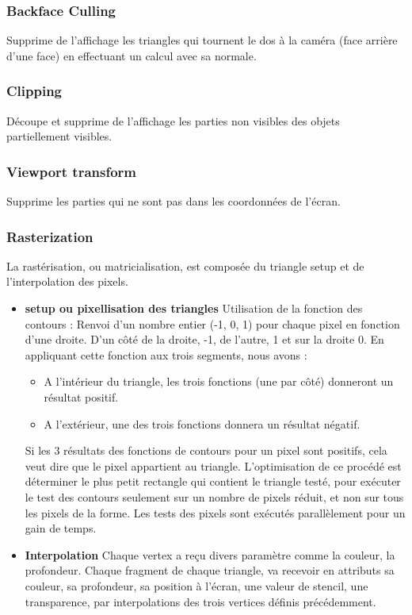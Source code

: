\subsubsection{Backface Culling}
Supprime de l’affichage les triangles qui  tournent le dos à la caméra (face arrière d’une face) en effectuant un calcul avec sa normale.
\subsubsection{Clipping}
Découpe et supprime de l’affichage les parties non visibles des objets partiellement visibles.
\subsubsection{Viewport transform}
Supprime les parties qui ne sont pas dans les coordonnées de l’écran.

\subsubsection{Rasterization}
La rastérisation, ou matricialisation, est composée du triangle setup et de l’interpolation des pixels.
\begin{itemize}
  \item{\textbf{setup ou pixellisation des triangles}} 
Utilisation de la fonction des contours : Renvoi d’un nombre entier (-1, 0, 1) pour chaque pixel en fonction d’une droite. D’un côté de la droite, -1, de l’autre, 1 et sur la droite 0.
En appliquant cette fonction aux trois segments, nous avons :
\begin{itemize}
	\item A l'intérieur du triangle, les trois fonctions (une par côté) donneront un résultat positif.
	\item A l'extérieur, une des trois fonctions donnera un résultat négatif.
\end{itemize}
Si les 3 résultats des fonctions de contours pour un pixel sont positifs, cela veut dire que le pixel appartient au triangle.
L’optimisation de ce procédé est déterminer le plus petit rectangle qui contient le triangle testé, pour exécuter le test des contours seulement sur un nombre de pixels réduit, et non sur tous les pixels de la forme.
Les tests des pixels sont exécutés parallèlement pour un gain de temps.
\item{\textbf{Interpolation}}
Chaque vertex a reçu divers paramètre comme la couleur, la profondeur. Chaque fragment  de chaque triangle, va recevoir en attributs sa couleur, sa profondeur, sa position à l’écran, une valeur de stencil, une transparence, par interpolations des trois vertices définis précédemment.
\end{itemize}
